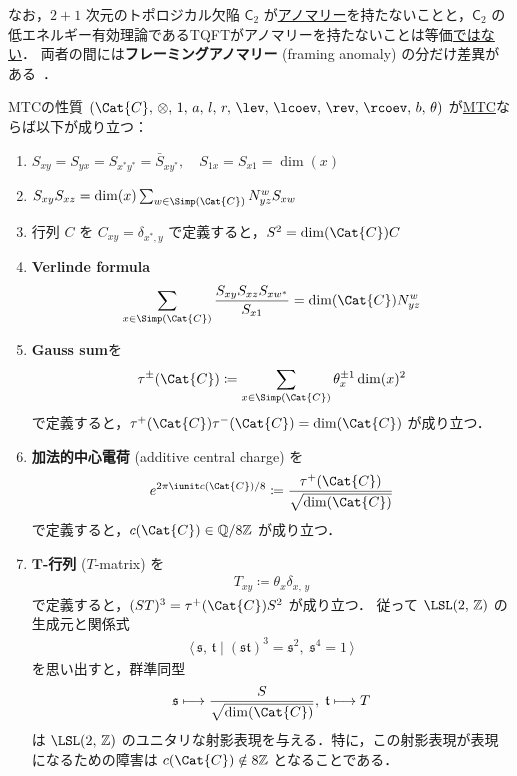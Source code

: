 \documentclass[TQFT_main]{subfiles}
\begin{document}
なお，$2+1$ 次元のトポロジカル欠陥 $\mathsf{C}_2$ が\hyperref[def:anomaly-QP]{アノマリー}を持たないことと，$\mathsf{C}_2$ の低エネルギー有効理論であるTQFTがアノマリーを持たないことは等価\underline{ではない}．
両者の間には\textbf{フレーミングアノマリー} (framing anomaly) の分だけ差異がある~\cite{turaev2010quantum}．

\begin{myprop}[label=prop:MTC]{MTCの性質}
    $(\Cat{C},\, \otimes,\, 1,\, a,\, l,\, r,\, \lev,\, \lcoev,\, \rev,\, \rcoev,\, b,\, \theta)$ が\hyperref[def:MTC]{MTC}ならば以下が成り立つ：
    \begin{enumerate}
        \item $S_{xy} = S_{yx} = S_{x^*y^*} = \bar{S}_{xy^*},\quad S_{1x} = S_{x1} = \dim (x)$
        \item $S_{xy} S_{xz} = \dim(x) \sum_{w \in \Simp(\Cat{C})} N^w_{yz} S_{xw}$
        \item 行列 $C$ を $C_{xy} = \delta_{x^*,y}$ で定義すると，$S^2 = \dim(\Cat{C}) C$
        \item \textbf{Verlinde formula}
        \begin{align}
            \sum_{x \in \Simp(\Cat{C})} \frac{S_{xy} S_{xz} S_{xw^*}}{S_{x1}} = \dim(\Cat{C}) N^w_{yz}
        \end{align}
        \item \textbf{Gauss sum}を
        \begin{align}
            \tau^{\pm} (\Cat{C}) \coloneqq \sum_{x \in \Simp(\Cat{C})} \theta_x^{\pm 1} \dim (x)^2
        \end{align}
        で定義すると，$\tau^+(\Cat{C}) \tau^-(\Cat{C}) = \dim (\Cat{C})$ が成り立つ．
        \item \textbf{加法的中心電荷} (additive central charge) を
        \begin{align}
            e^{2\pi \iunit c(\Cat{C})/8} \coloneqq \frac{\tau^+(\Cat{C})}{\sqrt{\dim (\Cat{C})}}
        \end{align}
        で定義すると，$c(\Cat{C}) \in \mathbb{Q} / 8 \mathbb{Z}$ が成り立つ．
        \item \textbf{$\bm{T}$-行列} ($T$-matrix) を
        \begin{align}
            T_{xy} \coloneqq \theta_x \delta_{x,\, y}
        \end{align}
        で定義すると，$(ST)^3 = \tau^+(\Cat{C}) S^2$ が成り立つ．
        従って $\LSL(2,\, \mathbb{Z})$ の生成元と関係式
        \begin{align}
            \langle\, \mathfrak{s},\, \mathfrak{t} \mid (\mathfrak{s}\mathfrak{t})^3 = \mathfrak{s}^2,\; \mathfrak{s}^4 = 1 \,\rangle
        \end{align}
        を思い出すと，群準同型
        \begin{align}
            \mathfrak{s} \lmto \frac{S}{\sqrt{\dim (\Cat{C})}},\; \mathfrak{t} \lmto T
        \end{align}
        は $\LSL(2,\, \mathbb{Z})$ のユニタリな射影表現を与える．特に，この射影表現が表現になるための障害は $c(\Cat{C}) \notin 8 \mathbb{Z}$ となることである．
    \end{enumerate}
    
\end{myprop}
\end{document}
